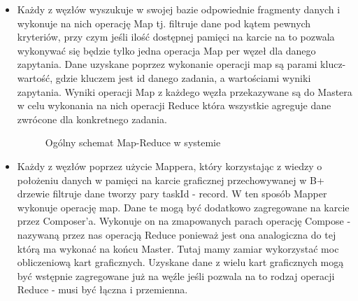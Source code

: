 \documentclass[paper=a4, fontsize=11pt]{scrartcl} %
\numberwithin{equation}{section} %
\numberwithin{figure}{section} %
\numberwithin{table}{section} %
\begin{document}
\begin{itemize}
	\item Każdy z węzłów wyszukuje w swojej bazie odpowiednie fragmenty danych i wykonuje na nich operację Map tj. filtruje dane pod kątem pewnych 
		kryteriów, przy czym jeśli ilość dostępnej pamięci na karcie na to pozwala wykonywać się będzie tylko jedna operacja Map per węzeł dla danego zapytania.
		Dane uzyskane poprzez wykonanie operacji map są parami klucz-wartość, gdzie kluczem jest id danego zadania, a wartościami wyniki zapytania. Wyniki
		operacji Map z każdego węzła przekazywane są do Mastera w celu wykonania na nich operacji Reduce która wszystkie agreguje dane zwrócone dla konkretnego zadania. 
		\begin{figure}[t]
			\begin{center}
				\caption{Ogólny schemat Map-Reduce w systemie}
			\end{center}
		\end{figure}
	\item Każdy z węzłów poprzez użycie Mappera, który korzystając z wiedzy o położeniu danych w pamięci na karcie graficznej przechowywanej w B+ drzewie filtruje dane tworzy
		pary taskId - record. W ten sposób Mapper wykonuje operację map. Dane te mogą być dodatkowo zagregowane na karcie przez Composer'a. Wykonuje on na zmapowanych
		parach operację Compose - nazywaną przez nas operacją Reduce ponieważ jest ona analogiczna do tej którą ma wykonać na końcu Master. Tutaj mamy zamiar wykorzystać
		moc obliczeniową kart graficznych. Uzyskane dane z wielu kart graficznych mogą być wstępnie zagregowane już na węźle jeśli pozwala na to rodzaj operacji Reduce - musi być łączna i przemienna.

\end{itemize}
\end{document}
